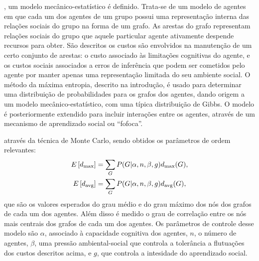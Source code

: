 , um modelo mecânico-estatístico é definido. Trata-se de um modelo de agentes em que cada um dos agentes de um grupo possui uma representação interna das relações sociais do grupo na forma de um grafo. As arestas do grafo representam relações sociais do grupo que aquele particular agente ativamente despende recursos para obter. São descritos os custos são envolvidos na manutenção de um certo conjunto de arestas: o custo associado às limitações cognitivas do agente, e os custos sociais associados a erros de inferência que podem ser cometidos pelo agente por manter apenas uma representação limitada do seu ambiente social. O método da máxima entropia, descrito na introdução, é usado para determinar uma distribuição de probabilidades para os grafos dos agentes, dando origem a um modelo mecânico-estatístico, com uma típica distribuição de Gibbs. O modelo é posteriormente extendido para incluir interações entre os agentes, através de um mecanismo de aprendizado social ou ``fofoca''. 

 através da técnica de Monte Carlo, sendo obtidos os parâmetros de ordem relevantes: 
\begin{align}
E\left[d_{\text{max}}\right] &= \sum_{G} P(G | \alpha, n, \beta, g) d_{\text{max}}(G), \\
E\left[d_{\text{avg}}\right] &= \sum_{G} P(G | \alpha, n, \beta, g) d_{\text{avg}}(G),
\end{align}
que são os valores esperados do grau médio e do grau máximo dos nós dos grafos de cada um dos agentes. Além disso é medido o grau de correlação entre os nós mais centrais dos grafos de cada um dos agentes. Os parâmetros de controle desse modelo são $\alpha$, associado à capacidade cognitiva dos agentes, $n$, o número de agentes, $\beta$, uma pressão ambiental-social que controla a tolerância a flutuações dos custos descritos acima, e $g$, que controla a intesidade do aprendizado social.

